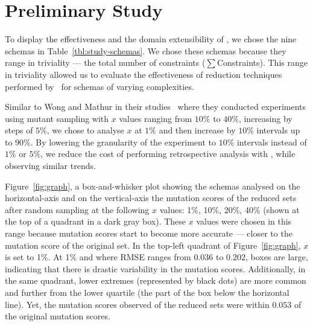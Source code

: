 \section{Preliminary Study}




To display the effectiveness and the domain extensibility of \mr, we chose the nine schemas in Table~\ref{tbl:study-schemas}.
We chose these schemas because they range in triviality --- the total number of constraints ({\small$\sum$Constraints}).
This range in triviality allowed us to evaluate the effectiveness of reduction techniques performed by \mr~for schemas of varying
complexities.

Similar to Wong and Mathur in their studies~\cite{mathur1994empirical, wong1993mutation} where they conducted experiments using
mutant sampling with $x$ values ranging from $10\%$ to $40\%$, increasing by steps of $5\%$, we chose to analyse $x$ at $1\%$ and
then increase by $10\%$ intervals up to $90\%$. By lowering the granularity of the experiment to $10\%$ intervals instead of $1\%$
or $5\%$, we reduce the cost of performing retrospective analysis with \mr, while observing similar trends.




Figure~\ref{fig:graph}, a box-and-whisker plot showing the schemas analysed on the horizontal-axis and on the vertical-axis the
mutation scores of the reduced sets after random sampling at the following $x$ values: 1\%, 10\%, 20\%, 40\% (shown at the top
of a quadrant in a dark gray box). These $x$ values were chosen in this range because mutation scores start to become more accurate ---
closer to the mutation score of the original set. In the top-left quadrant of Figure~\ref{fig:graph}, $x$ is set to 1\%. At 1\% and
where RMSE ranges from $0.036$ to $0.202$, boxes are large, indicating that there is drastic variability in the mutation scores.
Additionally, in the same quadrant, lower extremes (represented by black dots) are more common and further from the lower quartile (the part
of the box below the horizontal line). Yet, the mutation scores observed of the reduced sets were
within $0.053$ of the original mutation scores.

